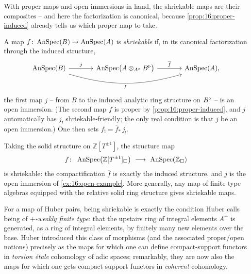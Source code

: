 With proper maps and open immersions in hand, the shriekable maps are their
composites -- and here the factorization is canonical, because
\cref{prop:16:proper-induced} already tells us which proper map to take.

\begin{definition}
\label{def:16:shriekable}
A map $f\colon\operatorname{AnSpec}(B)\to\operatorname{AnSpec}(A)$ is \emph{shriekable} if, in its canonical
factorization through the induced structure,
\begin{equation*}
\begin{tikzcd}[column sep=large, row sep=large]
\AnSpec(B) \arrow[r, "j"] \arrow[rr, bend right=16, "f"'] & \AnSpec\bigl(A\otimes_{\ur A}\ur B\bigr) \arrow[r, "\overline f"] & \AnSpec(A),
\end{tikzcd}
\end{equation*}
the first map $j$ -- from $B$ to the induced analytic ring structure on $B^{\triangleright}$ -- is an
open immersion. (The second map $\overline f$ is proper by
\cref{prop:16:proper-induced}, and $j$ automatically has $j_!$ shriekable-friendly; the
only real condition is that $j$ be an open immersion.) One then sets
$f_!=\overline f_*\,j_!$.
\end{definition}

\begin{example}
\label{ex:16:shriekable-gm}
Taking the solid structure on $\mathbb{Z}[T^{\pm1}]$, the structure map
\begin{equation*}
f\colon\ \AnSpec\bigl(\mathbb{Z}[T^{\pm1}]_\solid\bigr)\ \longrightarrow\ \AnSpec(\mathbb{Z}_\solid)
\end{equation*}
is shriekable: the compactification $\overline f$ is exactly the induced structure, and
$j$ is the open immersion of \cref{ex:16:open-example}. More generally, any map of
finite-type algebras equipped with the relative solid ring structure gives shriekable
maps.
\end{example}

\begin{remark}
\label{rmk:16:weakly-ft}
For a map of Huber pairs, being shriekable is exactly the condition Huber calls being
of \emph{$+$-weakly finite type}: that the upstairs ring of integral elements $A^+$ is
generated, as a ring of integral elements, by finitely many new elements over the
base. Huber introduced this class of morphisms (and the associated proper/open
notions) precisely as the maps for which one can define compact-support functors in
\emph{torsion \'etale} cohomology of adic spaces; remarkably, they are now also the
maps for which one gets compact-support functors in \emph{coherent} cohomology.
\end{remark}

